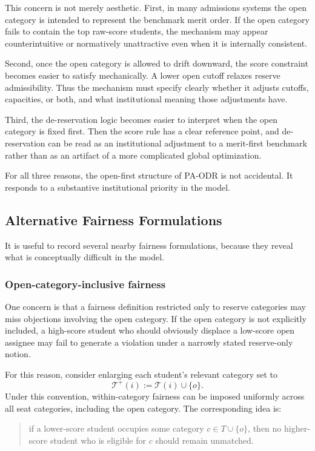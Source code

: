 \documentclass[12pt]{article}
\newcommand{\T}{\mathcal{T}}
\newcommand{\1}{\mathbf{1}}
\begin{document}
This concern is not merely aesthetic. First, in many admissions systems the open category is intended to represent the benchmark merit order. If the open category fails to contain the top raw-score students, the mechanism may appear counterintuitive or normatively unattractive even when it is internally consistent.

Second, once the open category is allowed to drift downward, the score constraint becomes easier to satisfy mechanically. A lower open cutoff relaxes reserve admissibility. Thus the mechanism must specify clearly whether it adjusts cutoffs, capacities, or both, and what institutional meaning those adjustments have.

Third, the de-reservation logic becomes easier to interpret when the open category is fixed first. Then the score rule has a clear reference point, and de-reservation can be read as an institutional adjustment to a merit-first benchmark rather than as an artifact of a more complicated global optimization.

For all three reasons, the open-first structure of PA-ODR is not accidental. It responds to a substantive institutional priority in the model.

\subsection{Alternative Fairness Formulations}
It is useful to record several nearby fairness formulations, because they reveal what is conceptually difficult in the model.

\subsubsection{Open-category-inclusive fairness}
One concern is that a fairness definition restricted only to reserve categories may miss objections involving the open category. If the open category is not explicitly included, a high-score student who should obviously displace a low-score open assignee may fail to generate a violation under a narrowly stated reserve-only notion.

For this reason, consider enlarging each student's relevant category set to
\[
\T^+(i):=\T(i)\cup\{o\}.
\]
Under this convention, within-category fairness can be imposed uniformly across all seat categories, including the open category. The corresponding idea is:

\begin{quote}
if a lower-score student occupies some category $c\in T\cup\{o\}$, then no higher-score student who is eligible for $c$ should remain unmatched.
\end{quote}
\end{document}
